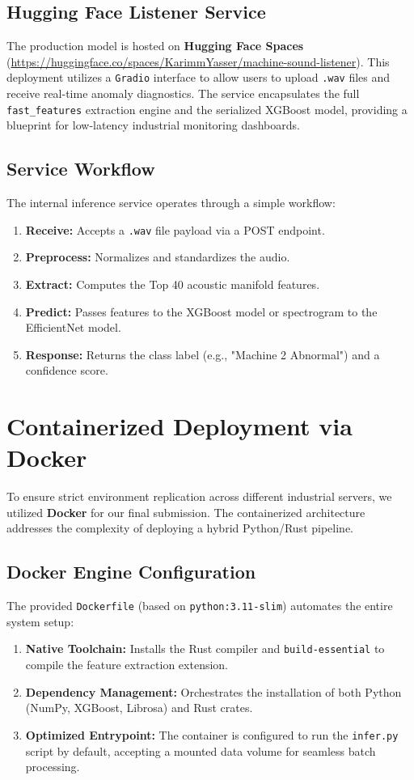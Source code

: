 \subsection{Hugging Face Listener Service}
The production model is hosted on \textbf{Hugging Face Spaces} (\url{https://huggingface.co/spaces/KarimmYasser/machine-sound-listener}). This deployment utilizes a \texttt{Gradio} interface to allow users to upload \texttt{.wav} files and receive real-time anomaly diagnostics. The service encapsulates the full \texttt{fast\_features} extraction engine and the serialized XGBoost model, providing a blueprint for low-latency industrial monitoring dashboards.

\subsection{Service Workflow}
The internal inference service operates through a simple workflow:
\begin{enumerate}
    \item \textbf{Receive:} Accepts a \texttt{.wav} file payload via a POST endpoint.
    \item \textbf{Preprocess:} Normalizes and standardizes the audio.
    \item \textbf{Extract:} Computes the Top 40 acoustic manifold features.
    \item \textbf{Predict:} Passes features to the XGBoost model or spectrogram to the EfficientNet model.
    \item \textbf{Response:} Returns the class label (e.g., "Machine 2 Abnormal") and a confidence score.
\end{enumerate}

\section{Containerized Deployment via Docker}
To ensure strict environment replication across different industrial servers, we utilized \textbf{Docker} for our final submission. The containerized architecture addresses the complexity of deploying a hybrid Python/Rust pipeline.

\subsection{Docker Engine Configuration}
The provided \texttt{Dockerfile} (based on \texttt{python:3.11-slim}) automates the entire system setup:
\begin{enumerate}
    \item \textbf{Native Toolchain:} Installs the Rust compiler and \texttt{build-essential} to compile the feature extraction extension.
    \item \textbf{Dependency Management:} Orchestrates the installation of both Python (NumPy, XGBoost, Librosa) and Rust crates.
    \item \textbf{Optimized Entrypoint:} The container is configured to run the \texttt{infer.py} script by default, accepting a mounted data volume for seamless batch processing.
\end{enumerate}

